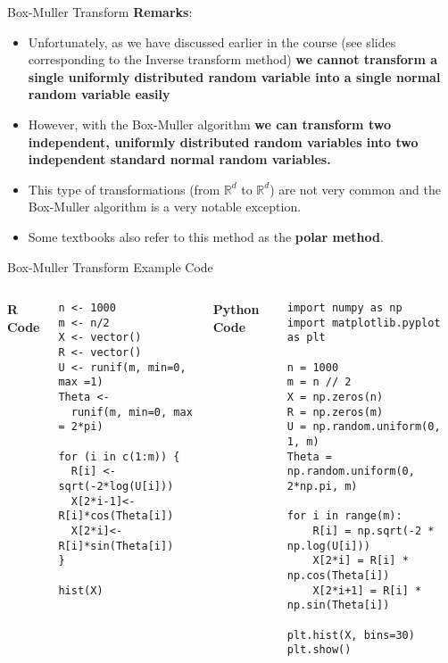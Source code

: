 \documentclass[8pt]{beamer}
\begin{document}
\begin{frame}{Box-Muller Transform}
\textbf{Remarks}: 

\begin{itemize}
	\item Unfortunately, as we have discussed earlier in the course (see slides corresponding to the Inverse transform method) \textbf{we cannot transform a single uniformly distributed random variable into a single normal random variable easily}
	\item However, with the Box-Muller algorithm \textbf{we can transform two independent, uniformly distributed random variables into two independent standard normal random variables.}
	\item This type of transformations (from $\mathbb{R}^d$ to $\mathbb{R}^d$) are not very common and the Box-Muller algorithm is a very notable exception.
	\item Some textbooks also refer to this method as the \textbf{polar method}.
\end{itemize}
\end{frame}

\begin{frame}[fragile]{Box-Muller Transform Example}
\alert{Code}
\vspace{2mm}

\begin{columns}
\textbf{R Code}
\begin{lstlisting}
n <- 1000
m <- n/2
X <- vector()
R <- vector()
U <- runif(m, min=0, max =1)
Theta <- 
  runif(m, min=0, max = 2*pi) 

for (i in c(1:m)) {
  R[i] <- sqrt(-2*log(U[i])) 
  X[2*i-1]<- R[i]*cos(Theta[i]) 
  X[2*i]<- R[i]*sin(Theta[i])
} 

hist(X)
\end{lstlisting}

\textbf{Python Code}

\begin{lstlisting}
import numpy as np
import matplotlib.pyplot as plt

n = 1000
m = n // 2
X = np.zeros(n)
R = np.zeros(m)
U = np.random.uniform(0, 1, m)
Theta = np.random.uniform(0, 2*np.pi, m)

for i in range(m):
    R[i] = np.sqrt(-2 * np.log(U[i]))
    X[2*i] = R[i] * np.cos(Theta[i])
    X[2*i+1] = R[i] * np.sin(Theta[i])

plt.hist(X, bins=30)
plt.show()
\end{lstlisting}

\end{columns}

\end{frame}
\end{document}
